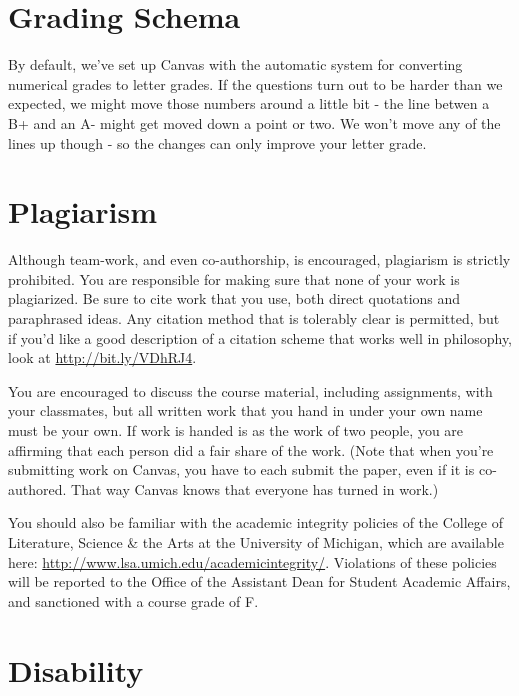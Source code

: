 \documentclass[
]{article}
\begin{document}
\hypertarget{grading-schema}{%
\section{Grading Schema}\label{grading-schema}}

By default, we've set up Canvas with the automatic system for converting
numerical grades to letter grades. If the questions turn out to be
harder than we expected, we might move those numbers around a little bit
- the line betwen a B+ and an A- might get moved down a point or two. We
won't move any of the lines up though - so the changes can only improve
your letter grade.

\hypertarget{plagiarism}{%
\section{Plagiarism}\label{plagiarism}}

Although team-work, and even co-authorship, is encouraged, plagiarism is
strictly prohibited. You are responsible for making sure that none of
your work is plagiarized. Be sure to cite work that you use, both direct
quotations and paraphrased ideas. Any citation method that is tolerably
clear is permitted, but if you'd like a good description of a citation
scheme that works well in philosophy, look at
\url{http://bit.ly/VDhRJ4}.

You are encouraged to discuss the course material, including
assignments, with your classmates, but all written work that you hand in
under your own name must be your own. If work is handed is as the work
of two people, you are affirming that each person did a fair share of
the work. (Note that when you're submitting work on Canvas, you have to
each submit the paper, even if it is co-authored. That way Canvas knows
that everyone has turned in work.)

You should also be familiar with the academic integrity policies of the
College of Literature, Science \& the Arts at the University of
Michigan, which are available here:
\url{http://www.lsa.umich.edu/academicintegrity/}. Violations of these
policies will be reported to the Office of the Assistant Dean for
Student Academic Affairs, and sanctioned with a course grade of F.

\hypertarget{disability}{%
\section{Disability}\label{disability}}
\end{document}

